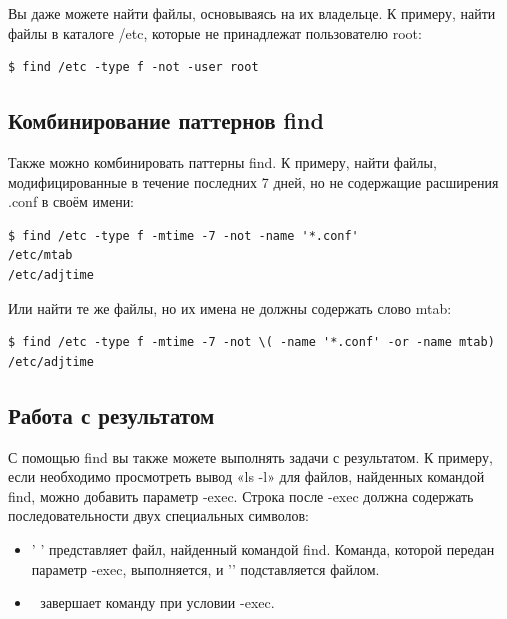 \documentclass[10pt]{book}
\begin{document}
Вы даже можете найти файлы, основываясь на их владельце. К примеру, найти файлы в каталоге /etc, которые не принадлежат пользователю root: 

\vspace{3mm}
\begin{tcolorbox}
\begin{lstlisting}
$ find /etc -type f -not -user root 
\end{lstlisting}
\end{tcolorbox}

\subsection {Комбинирование паттернов find}

Также можно комбинировать паттерны find. К примеру, найти файлы, модифицированные в течение последних 7 дней, но не содержащие расширения .conf в своём имени:

\vspace{3mm}
\begin{tcolorbox}
\begin{lstlisting}
$ find /etc -type f -mtime -7 -not -name '*.conf'
/etc/mtab
/etc/adjtime
\end{lstlisting}
\end{tcolorbox}

Или найти те же файлы, но их имена не должны содержать слово mtab:

\vspace{3mm}
\begin{tcolorbox}
\begin{lstlisting}
$ find /etc -type f -mtime -7 -not \( -name '*.conf' -or -name mtab)
/etc/adjtime
\end{lstlisting}
\end{tcolorbox}

\subsection {Работа с результатом}

С помощью find вы также можете выполнять задачи с результатом. К примеру, если необходимо просмотреть вывод «ls -l» для файлов, найденных командой find, можно добавить параметр -exec. Строка после -exec должна содержать последовательности двух специальных символов:

\begin{itemize}
\item '{ }' представляет файл, найденный командой find. Команда, которой передан параметр -exec, выполняется, и  '{}' подставляется файлом.
\item $\;$ завершает команду при условии -exec.
\end{itemize}
\end{document}
